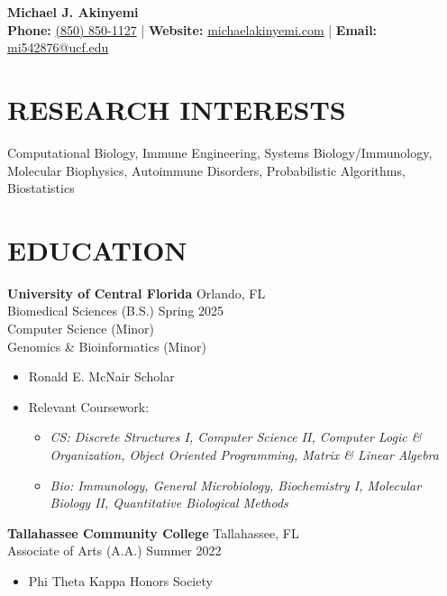 \documentclass[a4paper,9pt]{extarticle}
\begin{document}
\pagestyle{fancy} %
\renewcommand{\headrulewidth}{0pt}
\fancyhead{}
\thispagestyle{empty} %


\begin{center}
\textbf{\Huge Michael J. Akinyemi}\\[6pt]
 \textbf{Phone:} \href{tel:8505531127}{(850) 850-1127} | \textbf{Website:} \href{https://michaelakinyemi.com/}{michaelakinyemi.com} | \textbf{Email:} \href{mailto:mi542876@ucf.edu}{mi542876@ucf.edu}
\end{center}


\section*{RESEARCH INTERESTS}
\begin{center}
Computational Biology, Immune Engineering, Systems Biology/Immunology, Molecular Biophysics, Autoimmune Disorders, Probabilistic Algorithms, Biostatistics
\end{center}


\section*{EDUCATION}

\noindent\textbf{University of Central Florida} \hfill Orlando, FL \\
Biomedical Sciences (B.S.) \hfill Spring 2025 \\
Computer Science (Minor) \\
Genomics \& Bioinformatics (Minor)
\begin{itemize}
    \item Ronald E. McNair Scholar
    \item Relevant Coursework:
    \begin{itemize}
        \item \textit{CS: Discrete Structures I, Computer Science II, Computer Logic \& Organization, Object Oriented Programming, Matrix \& Linear Algebra}
        \item \textit{Bio: Immunology, General Microbiology, Biochemistry I, Molecular Biology II, Quantitative Biological Methods}
    \end{itemize}
\end{itemize}
\bigskip

\noindent\textbf{Tallahassee Community College} \hfill Tallahassee, FL \\
Associate of Arts (A.A.) \hfill Summer 2022
\begin{itemize}
    \item Phi Theta Kappa Honors Society
\end{itemize}
\end{document}
